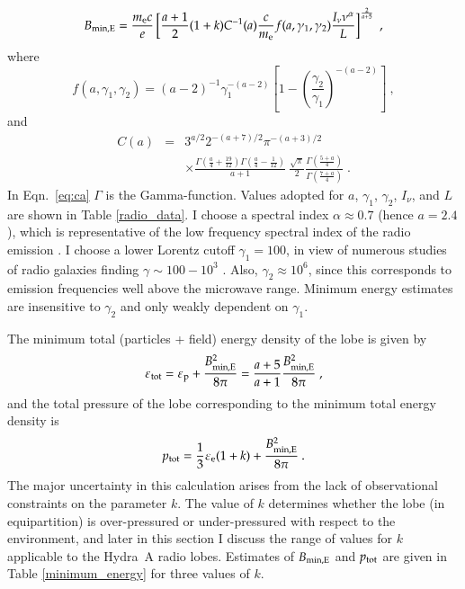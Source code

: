 \begin{equation}
B_{\rm{min,E}} = \frac{m_{\rm{e}} c}{e}\left[ \frac{a+1}{2}(1+k)C^{-1}(a)\frac{c}{m_{\rm{e}}}f(a,\gamma_1, \gamma_2)\frac{I_{\nu}\nu^{\alpha}}{L} \right]^{\frac{2}{a+5}}\;,
\label{e:bmin}
\end{equation}
where 
\begin{equation}
f(a, \gamma_1, \gamma_2) = (a-2)^{-1} \gamma_1^{-(a-2)} \left [ 1 - \left( \frac{\gamma_2}{\gamma_1}\right)^{-(a-2)}\right]\:,
\end{equation}
and 
\begin{eqnarray}
C(a) &=& 3^{a/2}2^{-(a+7)/2}\pi^{-(a+3)/2} \nonumber  \\
&& \times  \frac{\Gamma\left(\frac{a}{4}+\frac{19}{12}\right)\Gamma\left(\frac{a}{4}-\frac{1}{12}\right)}{a+1} \> 
\frac{\sqrt{\pi}}{2}\frac{\Gamma\left(\frac{5+a}{4}\right)}{\Gamma \left(\frac{7+a}{4}\right)}\;.\label{eq:ca}
\end{eqnarray}
In Eqn.~\eqref{eq:ca} $\Gamma$ is the Gamma-function. Values adopted for $a$, $\gamma_1$, $\gamma_2$, $I_{\nu}$, and $L$ are shown in Table \ref{radio_data}. I choose a spectral index $\alpha\approx0.7$ (hence $a=2.4$), which is representative of the low frequency spectral index of the radio emission \citep{cotton09}.
I choose a lower Lorentz cutoff $\gamma_1=100$, in view of numerous studies of radio galaxies finding $\gamma\sim100-10^3$  \citep{carilli91,  hardcastle01, godfrey09}. Also, $\gamma_2\approx10^6$, since this corresponds to emission frequencies well above the microwave range. Minimum energy estimates are insensitive to $\gamma_2$ and only weakly dependent on $\gamma_1$.

The minimum total (particles + field) energy density of the lobe is given by 
\begin{equation}
\varepsilon_{\rm{tot}} = \varepsilon_{\rm p} + \frac {B_{\rm min,E }^2}{8 \pi} = \frac{a+5}{a+1}\frac{B_{\rm{min,E}}^2}{8 \pi}\;,
\end{equation}
and the total pressure of the lobe corresponding to the minimum total energy density is
\begin{equation}
p_{\rm{tot}}=\frac{1}{3}\varepsilon_\text{e}(1+k)+\frac{B_\text{min,E}^2}{8 \pi}\:.
\label{total_pressure}
\end{equation}
The major uncertainty in this calculation arises from the lack of observational constraints on the parameter $k$. The value of $k$ determines whether the lobe (in equipartition) is over-pressured or under-pressured with respect to the environment, and later in this section I discuss the range of values for $k$ applicable to the Hydra~A radio lobes. Estimates of $B_{\rm{min,E}}$ and $p_{\rm{tot}}$ are given in Table \ref{minimum_energy} for three values of $k$. 

